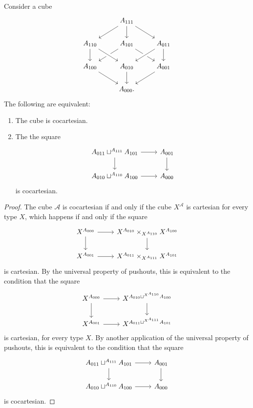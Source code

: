 \begin{thm}\label{thm:2pushout_iterated}
Consider a cube
\begin{equation*}
\begin{tikzcd}
& A_{111} \arrow[dl] \arrow[d] \arrow[dr] \\
A_{110} \arrow[d] & A_{101} \arrow[dl] \arrow[dr] & A_{011} \arrow[d] \\
A_{100} \arrow[dr] & A_{010} \arrow[d] \arrow[from=ul,crossing over] \arrow[from=ur,crossing over] & A_{001} \arrow[dl] \\
& A_{000}.
\end{tikzcd}
\end{equation*}
The following are equivalent:
\begin{enumerate}
\item The cube is cocartesian.
\item The the square
\begin{equation*}
\begin{tikzcd}
A_{011}\sqcup^{A_{111}} A_{101} \arrow[r] \arrow[d] & A_{001} \arrow[d] \\
A_{010}\sqcup^{A_{110}} A_{100} \arrow[r] & A_{000}
\end{tikzcd}
\end{equation*}
is cocartesian.
\end{enumerate}
\end{thm}

\begin{proof}
The cube $\mathcal{A}$ is cocartesian if and only if the cube $X^{\mathcal{A}}$ is cartesian for every type $X$, which happens if and only if the square
\begin{equation*}
\begin{tikzcd}
X^{A_{000}} \arrow[r] \arrow[d] & X^{A_{010}}\times_{X^{A_{110}}} X^{A_{100}} \arrow[d] \\
X^{A_{001}} \arrow[r] & X^{A_{011}}\times_{X^{A_{111}}} X^{A_{101}}
\end{tikzcd}
\end{equation*}
is cartesian. By the universal property of pushouts, this is equivalent to the condition that the square
\begin{equation*}
\begin{tikzcd}
X^{A_{000}} \arrow[r] \arrow[d] & X^{A_{010}\sqcup^{X^{A_{110}}}A_{100}} \arrow[d] \\
X^{A_{001}} \arrow[r] & X^{A_{011}\sqcup^{X^{A_{111}}}A_{101}}
\end{tikzcd}
\end{equation*}
is cartesian, for every type $X$. By another application of the universal property of pushouts, this is equivalent to the condition that the square
\begin{equation*}
\begin{tikzcd}
A_{011}\sqcup^{A_{111}} A_{101} \arrow[r] \arrow[d] & A_{001} \arrow[d] \\
A_{010}\sqcup^{A_{110}} A_{100} \arrow[r] & A_{000}
\end{tikzcd}
\end{equation*}
is cocartesian.
\end{proof}

